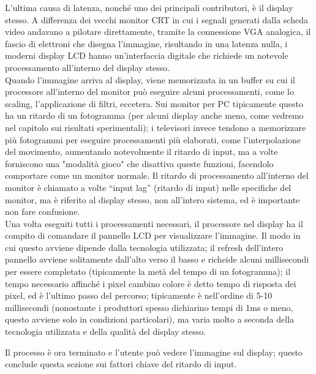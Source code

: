 L'ultima causa di latenza, nonché uno dei principali contributori, è il display stesso. A differenza dei vecchi monitor CRT in cui i segnali generati dalla scheda video andavano a pilotare direttamente, tramite la connessione VGA analogica, il fascio di elettroni che disegna l'immagine, risultando in una latenza nulla, i moderni display LCD hanno un'interfaccia digitale che richiede un notevole processamento all'interno del display stesso.\\
Quando l'immagine arriva al display, viene memorizzata in un buffer su cui il processore all'interno del monitor può eseguire alcuni processamenti, come lo scaling, l'applicazione di filtri, eccetera. Sui monitor per PC tipicamente questo ha un ritardo di un fotogramma (per alcuni display anche meno, come vedremo nel capitolo sui risultati sperimentali); i televisori invece tendono a memorizzare più fotogrammi per eseguire processamenti più elaborati, come l'interpolazione del movimento, aumentando notevolmente il ritardo di input, ma a volte forniscono una "modalità gioco" che disattiva queste funzioni, facendolo comportare come un monitor normale. Il ritardo di processamento all'interno del monitor è chiamato a volte ``input lag'' (ritardo di input) nelle specifiche del monitor, ma è riferito al display stesso, non all'intero sistema, ed è importante non fare confusione.\\
Una volta eseguiti tutti i processamenti necessari, il processore nel display ha il compito di comandare il pannello LCD per visualizzare l'immagine. Il modo in cui questo avviene dipende dalla tecnologia utilizzata; il refresh dell'intero pannello avviene solitamente dall'alto verso il basso e richeide alcuni millisecondi per essere completato (tipicamente la metà del tempo di un fotogramma); il tempo necessario affinché i pixel cambino colore è detto tempo di risposta dei pixel, ed è l'ultimo passo del percorso; tipicamente è nell'ordine di 5-10 millisecondi (nonostante i produttori spesso dichiarino tempi di 1ms o meno, questo avviene solo in condizioni particolari), ma varia molto a seconda della tecnologia utilizzata e della qualità del display stesso.

Il processo è ora terminato e l'utente può vedere l'immagine sul display; questo conclude questa sezione sui fattori chiave del ritardo di input.
